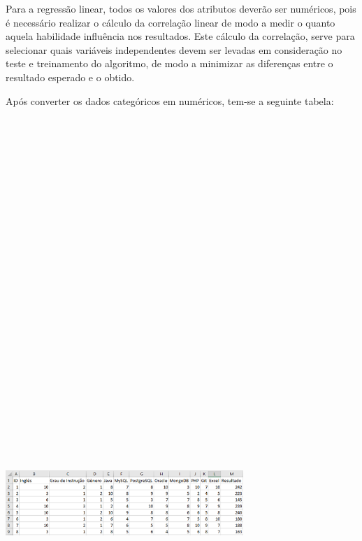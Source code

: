 \documentclass[conference]{IEEEtran}
\begin{document}
Para a regressão linear, todos os valores dos atributos deverão ser numéricos, pois é necessário realizar o cálculo da correlação linear de modo a medir o quanto aquela habilidade influência nos resultados. Este cálculo da correlação, serve para selecionar quais variáveis independentes devem ser levadas em consideração no teste e treinamento do algoritmo, de modo a minimizar as diferenças entre o resultado esperado e o obtido.

Após converter os dados categóricos em numéricos, tem-se a seguinte tabela:

\vspace{7mm}
\centerline{\includegraphics[width=90mm,height=600mm,keepaspectratio]{Tabela2.png}}
\vspace{7mm}
\end{document}

